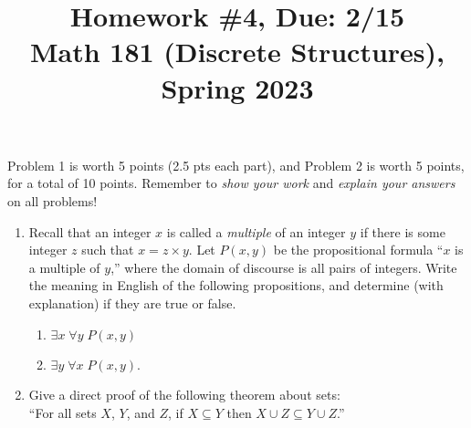 \documentclass[11pt]{article}
\title{Homework \#4, Due: 2/15 \\Math 181 (Discrete Structures), Spring 2023}
\date{}
\begin{document}
\maketitle

\thispagestyle{empty}

\vspace{-1cm}

Problem 1 is worth 5 points (2.5 pts each part), and Problem 2 is worth 5 points, for a total of 10 points. Remember to \emph{show your work} and \emph{explain your answers} on all problems!

\begin{enumerate}
\item Recall that an integer $x$ is called a \emph{multiple} of an integer $y$ if there is some integer $z$ such that $x = z \times y$. Let $P(x,y)$ be the propositional formula ``$x$ is a multiple of $y$,'' where the domain of discourse is all pairs of integers. Write the meaning in English of the following propositions, and determine (with explanation) if they are true or false.
\begin{enumerate}
\item $\exists x \; \forall y \; P(x,y)$
\item $\exists y \; \forall x \; P(x,y)$.
\end{enumerate}

\item Give a direct proof of the following theorem about sets: \\ ``For all sets $X$, $Y$, and $Z$, if $X\subseteq Y$ then $X\cup Z \subseteq Y \cup Z$.''
\end{enumerate}
\end{document}
